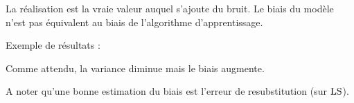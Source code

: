 		
		La réalisation est la vraie valeur auquel s'ajoute du bruit. Le biais du modèle n'est pas équivalent au biais de l'algorithme d'apprentissage.
				
		Exemple de résultats :
		
		
		Comme attendu, la variance diminue mais le biais augmente.
		
		A noter qu'une bonne estimation du biais est l'erreur de resubstitution (sur $\text{LS}$).